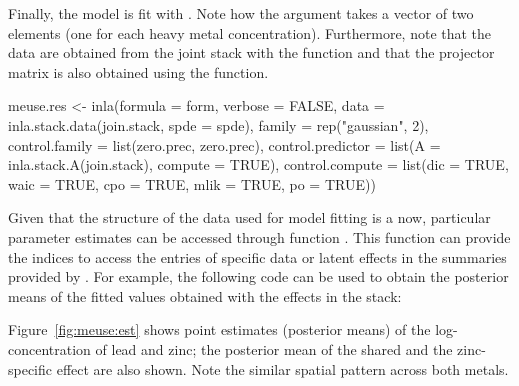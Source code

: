 Finally, the model is fit with . Note how the  argument takes a vector of two  elements (one for each heavy metal concentration). Furthermore, note that the data are obtained from the joint stack with the  function and that the projector matrix  is also obtained using the  function. 

\begin{example*}
meuse.res <- inla(formula = form, verbose = FALSE, 
  data = inla.stack.data(join.stack, spde = spde),
  family = rep("gaussian", 2), 
  control.family = list(zero.prec, zero.prec),
  control.predictor = list(A = inla.stack.A(join.stack), compute = TRUE),
  control.compute = list(dic = TRUE, waic = TRUE, cpo = TRUE, mlik = TRUE, po = TRUE))
\end{example*}

Given that the structure of the data used for model fitting is a  now, particular parameter estimates can be accessed through function . This function can provide the indices to access the entries of
specific data or latent effects in the summaries provided by . For example, the following code can be used to obtain the posterior means of the fitted values obtained with the effects in the  stack:


Figure~\ref{fig:meuse:est} shows point estimates (posterior means) of the log-concentration of lead and zinc; the posterior mean of the shared and the zinc-specific effect are also shown. Note the similar spatial pattern across both metals.




